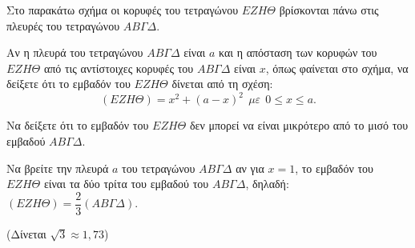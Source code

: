 {Στο παρακάτω σχήμα οι κορυφές του τετραγώνου $EZH\Theta$ βρίσκονται πάνω στις πλευρές του τετραγώνου $AB\Gamma\Delta$.
\begin{alist}
\item Αν η πλευρά του τετραγώνου $AB\Gamma\Delta$ είναι $a$ και η απόσταση των κορυφών του $EZH\Theta$ από τις αντίστοιχες κορυφές του $AB\Gamma\Delta$ είναι $x$, όπως φαίνεται στο σχήμα, να δείξετε ότι το εμβαδόν του $EZH\Theta$ δίνεται από τη σχέση:
\begin{equation*}(EZH\Theta) = x^{2} + (a - x)^{2}\ \ \mu\varepsilon\ \ 0 \leq x \leq a.\end{equation*}
\item Να δείξετε ότι το εμβαδόν του $EZH\Theta$ δεν μπορεί να είναι μικρότερο από το μισό του εμβαδού $AB\Gamma\Delta$.

\item Να βρείτε την πλευρά $a$ του τετραγώνου $AB\Gamma\Delta$ αν για $x = 1$, το εμβαδόν του $EZH\Theta$ είναι τα δύο τρίτα του εμβαδού του $AB\Gamma\Delta$, δηλαδή: $(EZH\Theta) = \dfrac{2}{3}(AB\Gamma\Delta)$.

(Δίνεται $\sqrt{3} \approx 1,73$)
\end{alist}}


